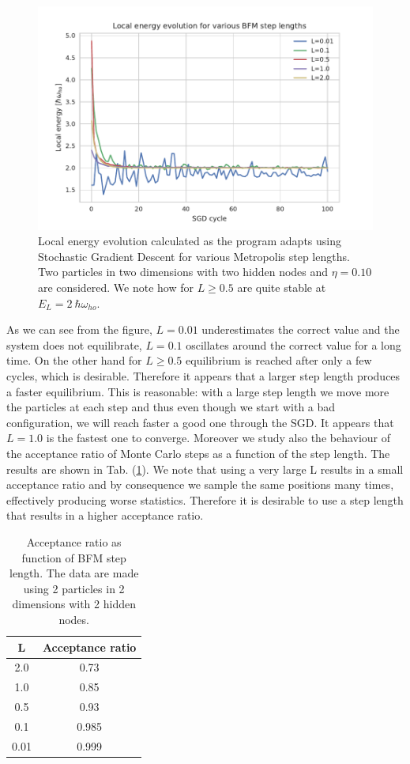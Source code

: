 \begin{figure}[H]
\centering
\includegraphics[scale=1.0]{plot1.pdf}
\caption{Local energy evolution calculated as the program adapts using Stochastic Gradient Descent for various Metropolis step lengths. Two particles in two dimensions with two hidden nodes and $\eta = 0.10$ are considered. We note how for $L\geq 0.5$ are quite stable at $E_L=2\ \hbar\omega_{ho}$.}
\label{Fig:1}
\end{figure}

As we can see from the figure, $L=0.01$ underestimates the correct value and the system does not equilibrate, $L=0.1$ oscillates around the correct value for a long time. On the other hand for $L\geq0.5$ equilibrium is reached after only a few cycles, which is desirable. Therefore it appears that a larger step length produces a faster equilibrium. This is reasonable: with a large step length we move more the particles at each step and thus even though we start with a bad configuration, we will reach faster a good one through the SGD. It appears that $L=1.0$ is the fastest one to converge. 
Moreover we study also the behaviour of the acceptance ratio of Monte Carlo steps as a function of the step length. The results are shown in Tab. (\ref{Tab:1}). We note that using a very large L results in a small acceptance ratio and by consequence we sample the same positions many times, effectively producing worse statistics. Therefore it is desirable to use a step length that results in a higher acceptance ratio. 

\begin{table}[H]
\caption{Acceptance ratio as function of BFM step length. The data are made using  2 particles in 2 dimensions with 2 hidden nodes.}
\centering
\begin{tabular}{c| c } 
\textbf{L} & \textbf{Acceptance ratio} \\ \hline
2.0  & 0.73   \\
1.0 & 0.85  \\
0.5  &  0.93 \\
0.1  &  0.985 \\
0.01  &  0.999 \\ 
\end{tabular}
\label{Tab:1}
\end{table} 

